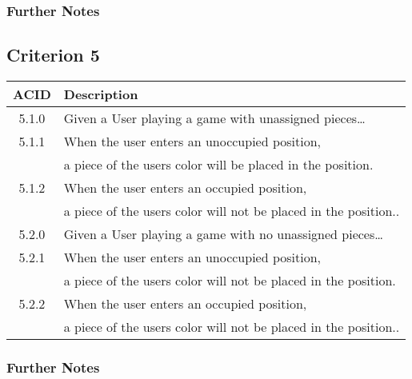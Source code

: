 \documentclass[11pt]{article}
\begin{document}
\subsubsection*{Further Notes}
\label{sec:orgdd04c45}

\subsection{Criterion 5}
\label{sec:org748d4d0}
\begin{center}
\begin{tabular}{|c|l|}
ACID & Description\\
\hline
5.1.0 & Given a User playing a game with unassigned pieces\ldots{}\\
\hline
5.1.1 & When the user enters an unoccupied position,\\
 & a piece of the users color will be placed in the position.\\
5.1.2 & When the user enters an occupied position,\\
 & a piece of the users color will not be placed in the position..\\
\hline
5.2.0 & Given a User playing a game with no unassigned pieces\ldots{}\\
\hline
5.2.1 & When the user enters an unoccupied position,\\
 & a piece of the users color will not be placed in the position.\\
5.2.2 & When the user enters an occupied position,\\
 & a piece of the users color will not be placed in the position..\\
\end{tabular}
\end{center}

\subsubsection*{Further Notes}
\label{sec:org89f8c8c}
\end{document}

